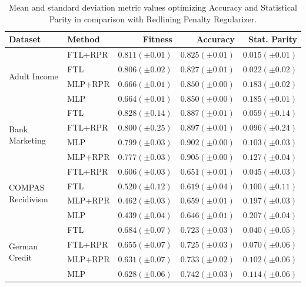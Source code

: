  \begin{table}
    \centering
    \caption{Mean and standard deviation metric values optimizing Accuracy and Statistical Parity in comparison with Redlining Penalty Regularizer.}\label{tab:complete_acc_parity_rpr}
   {\footnotesize \begin{tabular}{llrrr}
    \toprule
    Dataset & Method & Fitness & Accuracy & Stat. Parity \\
    \midrule

    \multirow[t]{4}{*}{Adult Income} & FTL+RPR & $0.811 (\pm0.01)$ & $0.825 (\pm0.01)$ & $0.015 (\pm0.01)$ \\
     & FTL & $0.806 (\pm0.02)$ & $0.827 (\pm0.01)$ & $0.022 (\pm0.02)$ \\
     & MLP+RPR & $0.666 (\pm0.01)$ & $0.850 (\pm0.00)$ & $0.183 (\pm0.02)$ \\
     & MLP & $0.664 (\pm0.01)$ & $0.850 (\pm0.00)$ & $0.185 (\pm0.01)$ \\
    \midrule
    \multirow[t]{4}{*}{Bank Marketing} & FTL & $0.828 (\pm0.14)$ & $0.887 (\pm0.01)$ & $0.059 (\pm0.14)$ \\
     & FTL+RPR & $0.800 (\pm0.25)$ & $0.897 (\pm0.01)$ & $0.096 (\pm0.24)$ \\
     & MLP & $0.799 (\pm0.03)$ & $0.902 (\pm0.00)$ & $0.103 (\pm0.03)$ \\
     & MLP+RPR & $0.777 (\pm0.03)$ & $0.905 (\pm0.00)$ & $0.127 (\pm0.04)$ \\
    \midrule
    \multirow[t]{4}{*}{COMPAS Recidivism} & FTL+RPR & $0.606 (\pm0.03)$ & $0.651 (\pm0.01)$ & $0.045 (\pm0.03)$ \\
     & FTL & $0.520 (\pm0.12)$ & $0.619 (\pm0.04)$ & $0.100 (\pm0.11)$ \\
     & MLP+RPR & $0.462 (\pm0.03)$ & $0.659 (\pm0.01)$ & $0.197 (\pm0.03)$ \\
     & MLP & $0.439 (\pm0.04)$ & $0.646 (\pm0.01)$ & $0.207 (\pm0.04)$ \\
    \midrule
    \multirow[t]{4}{*}{German Credit} & FTL & $0.684 (\pm0.07)$ & $0.723 (\pm0.03)$ & $0.040 (\pm0.05)$ \\
     & FTL+RPR & $0.655 (\pm0.07)$ & $0.725 (\pm0.03)$ & $0.070 (\pm0.06)$ \\
     & MLP+RPR & $0.631 (\pm0.07)$ & $0.733 (\pm0.02)$ & $0.102 (\pm0.06)$ \\
     & MLP & $0.628 (\pm0.06)$ & $0.742 (\pm0.03)$ & $0.114 (\pm0.06)$ \\
     \bottomrule
\end{tabular}}
\end{table}



